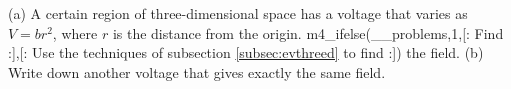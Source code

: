         (a) A certain region of three-dimensional space has a voltage that varies as
        $V=br^2$, where $r$ is the distance from the origin.
m4_ifelse(__problems,1,[:%
  Find
:],[:%
        Use the techniques of subsection \ref{subsec:evthreed}
        to find 
:])%
the field.\answercheck\hwendpart
        (b) Write down another voltage that gives exactly the same field.
